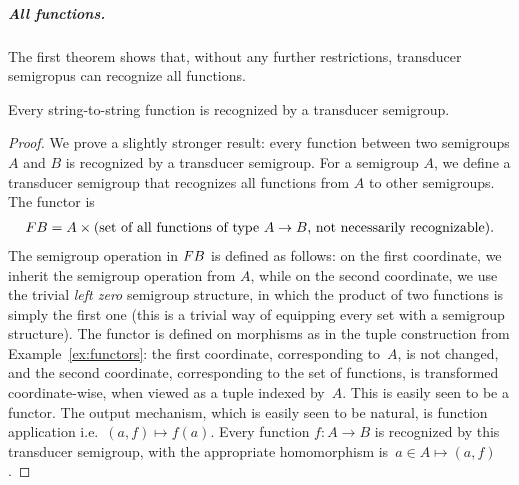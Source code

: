 \subparagraph{All functions.} The first theorem shows that, without any further restrictions, transducer semigropus can recognize all functions.

\begin{theorem}\label{thm:all-functions} 
 Every string-to-string function is recognized by a transducer semigroup.
\end{theorem}
\begin{proof}
 We prove a slightly stronger result: every function between two semigroups $A$ and $B$ is recognized by a transducer semigroup.
 For a semigroup $A$, we define a transducer semigroup that recognizes all functions from $A$ to other semigroups. The functor is 
 \begin{align*}
 \functor B = A \times \text{(set of all functions of type $A \to B$, not necessarily recognizable)}.
 \end{align*}
 The semigroup operation in $\functor B$ is defined as follows: on the first coordinate, we inherit the semigroup operation from $A$, while on the second coordinate, we use the trivial \emph{left zero} semigroup structure, in which  the product of two functions is simply the first one (this is a trivial way of equipping every set with a semigroup structure). The functor is defined on morphisms
as in the tuple construction from Example~\ref{ex:functors}: the first coordinate, corresponding to~$A$, is not changed, and the second coordinate, corresponding to the set of functions, is transformed coordinate-wise, when viewed as a tuple indexed by~$A$. This is easily seen to be a functor. The output mechanism, which is easily seen to be natural, is function application i.e.~$(a,f) \mapsto f(a)$.
Every function $f : A \to B$ is recognized by this transducer semigroup, with the appropriate homomorphism is~$a \in A \mapsto (a,f)$.
\end{proof}

